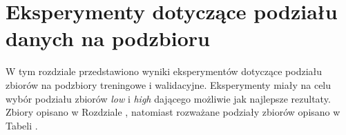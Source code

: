 \section{Eksperymenty dotyczące podziału danych na podzbioru}
\label{sec:podzial_eksperyment}

W tym rozdziale przedstawiono wyniki eksperymentów dotyczące podziału zbiorów na podzbiory treningowe i walidacyjne.
Eksperymenty miały na celu wybór podziału zbiorów \textit{low} i \textit{high} dającego możliwie jak najlepsze rezultaty. Zbiory opisano w Rozdziale , natomiast rozważane podziały zbiorów opisano w Tabeli .
